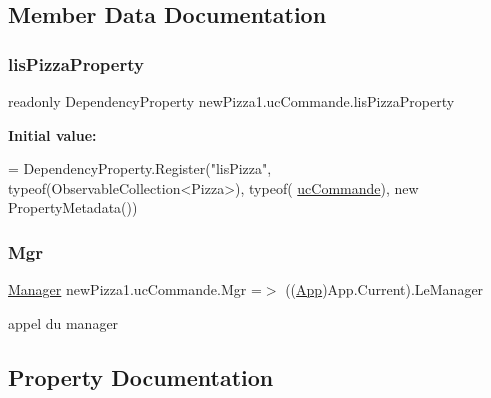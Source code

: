 \subsection{Member Data Documentation}
\mbox{\label{classnewPizza1_1_1ucCommande_a9cbd5cc0edb8769f5ff81c8e075b49e9}} 
\subsubsection{\texorpdfstring{lis\+Pizza\+Property}{lisPizzaProperty}}
{\footnotesize\ttfamily readonly Dependency\+Property new\+Pizza1.\+uc\+Commande.\+lis\+Pizza\+Property\hspace{0.3cm}{\ttfamily [static]}}

{\bfseries Initial value\+:}
\begin{DoxyCode}
=
            DependencyProperty.Register(\textcolor{stringliteral}{"lisPizza"}, typeof(ObservableCollection<Pizza>), typeof(
      \hyperlink{classnewPizza1_1_1ucCommande_a88406ed23ff1661dbb4645b407849445}{ucCommande}), \textcolor{keyword}{new} PropertyMetadata())
\end{DoxyCode}
\mbox{\label{classnewPizza1_1_1ucCommande_a5729f4554d2a1211716ccbb5179dfee3}} 
\subsubsection{\texorpdfstring{Mgr}{Mgr}}
{\footnotesize\ttfamily \hyperlink{classModele_1_1Manager}{Manager} new\+Pizza1.\+uc\+Commande.\+Mgr =$>$ ((\hyperlink{classnewPizza1_1_1App}{App})App.\+Current).Le\+Manager}



appel du manager 



\subsection{Property Documentation}
\mbox{\label{classnewPizza1_1_1ucCommande_a836cce8453ff18e05badea0deaaec810}} 
